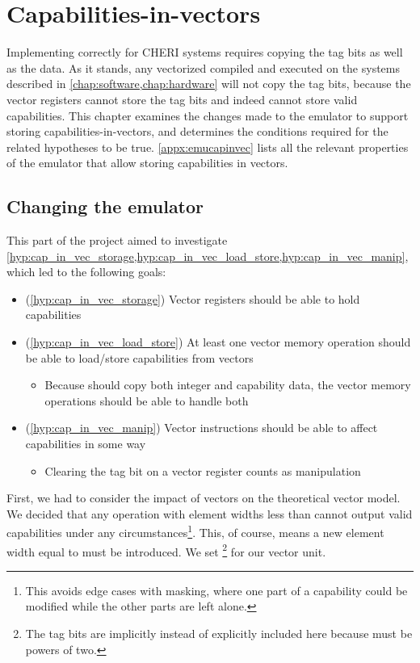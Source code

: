 \documentclass[../thesis]{subfiles}
\begin{document}
\chapter{Capabilities-in-vectors\label{chap:capinvec}}
Implementing  correctly for CHERI systems requires copying the tag bits as well as the data.
As it stands, any vectorized  compiled and executed on the systems described in \cref{chap:software,chap:hardware} will not copy the tag bits, because the vector registers cannot store the tag bits and indeed cannot store valid capabilities.
This chapter examines the changes made to the emulator to support storing capabilities-in-vectors, and determines the conditions required for the related hypotheses to be true.
\cref{appx:emucapinvec} lists all the relevant properties of the emulator that allow storing capabilities in vectors.

\section{Changing the emulator}
This part of the project aimed to investigate \cref{hyp:cap_in_vec_storage,hyp:cap_in_vec_load_store,hyp:cap_in_vec_manip}, which led to the following goals:
\begin{itemize}
    \item (\cref{hyp:cap_in_vec_storage}) Vector registers should be able to hold capabilities 
    \item (\cref{hyp:cap_in_vec_load_store}) At least one vector memory operation should be able to load/store capabilities from vectors
    \begin{itemize}
        \item Because  should copy both integer and capability data, the vector memory operations should be able to handle both
    \end{itemize}
    \item (\cref{hyp:cap_in_vec_manip}) Vector instructions should be able to affect capabilities in some way
    \begin{itemize}
        \item Clearing the tag bit on a vector register counts as manipulation
    \end{itemize}
\end{itemize}

First, we had to consider the impact of vectors on the theoretical vector model.
We decided that any operation with element widths less than  cannot output valid capabilities under any circumstances\footnote{This avoids edge cases with masking, where one part of a capability could be modified while the other parts are left alone.}.
This, of course, means a new element width equal to  must be introduced.
We set \footnote{The tag bits are implicitly instead of explicitly included here because  must be powers of two.} for our vector unit.
\end{document}
